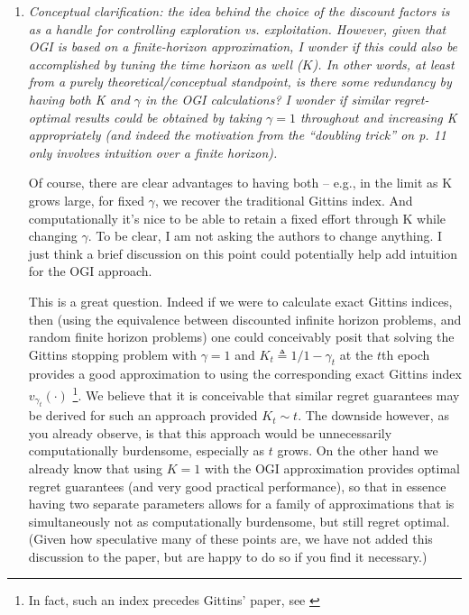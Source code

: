 \documentclass[11pt]{article}
\newcommand{\1}{\ensuremath{\mathbf{1}}} %
\theoremstyle{thm-sf}
\begin{document}
\begin{enumerate}
{\em (b) when approximations are used (e.g., Powell and Ryzhov 2012) can you please briefly discuss how good these approximations are?}

Thank you for the suggestion. We added a brief discussion of the approximations and believe it helps add context to make the relevant sections more readable.
		
\item {\it Conceptual clarification: the idea behind the choice of the discount factors is as a handle for controlling exploration vs. exploitation. However, given that OGI is based on a finite-horizon approximation, I wonder if this could also be accomplished by tuning the time horizon as well ($K$). In other words, at least from a purely theoretical/conceptual standpoint, is there some redundancy by having both K and $\gamma$ in the OGI calculations? I wonder if similar regret-optimal results could be obtained by taking $\gamma=1$ throughout and increasing K appropriately (and indeed the motivation from the “doubling trick” on p. 11 only involves intuition over a finite horizon).

Of course, there are clear advantages to having both – e.g., in the limit as K grows large, for fixed $\gamma$, we recover the traditional Gittins index. And computationally it’s nice to be able to retain a fixed effort through K while changing $\gamma$.
To be clear, I am not asking the authors to change anything. I just think a brief discussion on this point could potentially help add intuition for the OGI approach.	
}

	
This is a great question. Indeed if we were to calculate exact Gittins indices, then (using the equivalence between discounted infinite horizon problems, and random finite horizon problems) one could conceivably posit that solving the Gittins stopping problem with $\gamma = 1$ and $K_t \triangleq 1/1 - \gamma_t$ at the $t$th epoch provides a good approximation to using the corresponding exact Gittins index $v_{\gamma_t}(\cdot)$ \footnote{In fact, such an index precedes Gittins' paper, see \cite{bradt1956sequential}}. We believe that it is conceivable that similar regret guarantees may be derived for such an approach provided $K_t \sim t$. The downside however, as you already observe, is that this approach would be unnecessarily computationally burdensome, especially as $t$ grows. On the other hand we already know that using $K=1$ with the OGI approximation provides optimal regret guarantees (and very good practical performance), so that in essence having two separate parameters allows for a family of approximations that is simultaneously not as computationally burdensome, but still regret optimal. (Given how speculative many of these points are, we have not added this discussion to the paper, but are happy to do so if you find it necessary.) 





\end{enumerate}
\end{document}
